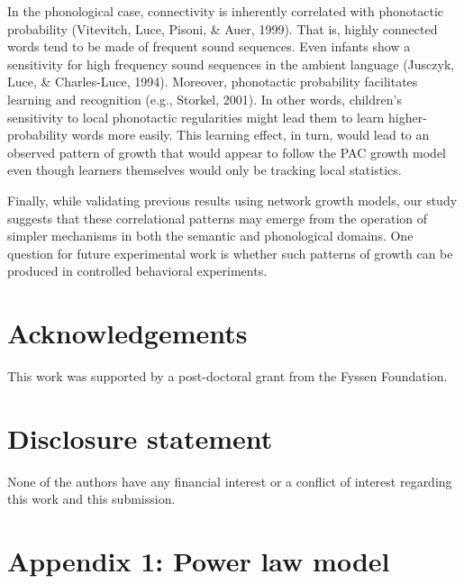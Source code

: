 \documentclass[english,floatsintext,man]{apa6}
\theoremstyle{definition}
\theoremstyle{definition}
\theoremstyle{definition}
\theoremstyle{remark}
\begin{document}
In the phonological case, connectivity is inherently correlated with
phonotactic probability (Vitevitch, Luce, Pisoni, \& Auer, 1999). That
is, highly connected words tend to be made of frequent sound sequences.
Even infants show a sensitivity for high frequency sound sequences in
the ambient language (Jusczyk, Luce, \& Charles-Luce, 1994). Moreover,
phonotactic probability facilitates learning and recognition (e.g.,
Storkel, 2001). In other words, children's sensitivity to local
phonotactic regularities might lead them to learn higher-probability
words more easily. This learning effect, in turn, would lead to an
observed pattern of growth that would appear to follow the PAC growth
model even though learners themselves would only be tracking local
statistics.

Finally, while validating previous results using network growth models,
our study suggests that these correlational patterns may emerge from the
operation of simpler mechanisms in both the semantic and phonological
domains. One question for future experimental work is whether such
patterns of growth can be produced in controlled behavioral experiments.

\vspace{1em}

\vspace{1em}

\section{Acknowledgements}\label{acknowledgements}

This work was supported by a post-doctoral grant from the Fyssen
Foundation.

\section{Disclosure statement}\label{disclosure-statement}

None of the authors have any financial interest or a conflict of
interest regarding this work and this submission.

\section{Appendix 1: Power law model}\label{appendix-1-power-law-model}
\end{document}
